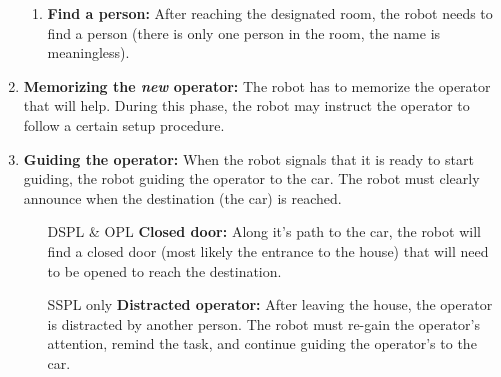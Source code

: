 \begin{enumerate}
\begin{enumerate}
    \item \textbf{Find a person:} After reaching the designated room, the robot needs to find a person (there is only one person in the room, the name is meaningless).
  \end{enumerate}

  \item \textbf{Memorizing the \emph{new} operator:} The robot has to memorize the operator that will help. During this phase, the robot may instruct the operator to follow a certain setup procedure.

  \item \textbf{Guiding the operator:} When the robot signals that it is ready to start guiding, the robot guiding the operator to the car. The robot must clearly announce when the destination (the car) is reached.
  \begin{itemize}[leftmargin=3cm]
    \item[DSPL \& OPL] \textbf{Closed door:} Along it's path to the car, the robot will find a closed door (most likely the entrance to the house) that will need to be opened to reach the destination.
    \item[SSPL only] \textbf{Distracted operator:} After leaving the house, the operator is distracted by another person. The robot must re-gain the operator's attention, remind the task, and continue guiding the operator's to the car.
  \end{itemize}

\end{enumerate}

